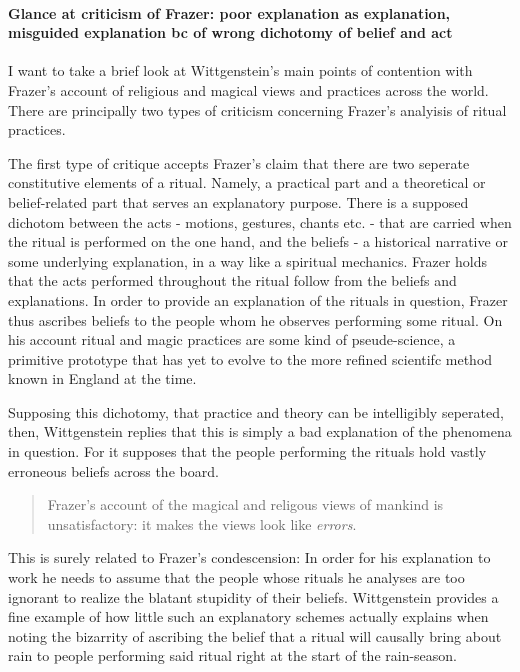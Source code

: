 \documentclass{article}
\begin{document}
 
\paragraph{Glance at criticism of Frazer: poor explanation as explanation, misguided explanation bc of wrong dichotomy of belief and act}
I want to take a brief look at Wittgenstein's main points of contention with Frazer's account of religious and magical views and practices across the world. There are principally two types of criticism concerning Frazer's analyisis of ritual practices. 

The first type of critique accepts Frazer's claim that there are two seperate constitutive elements of a ritual. Namely, a practical part and a theoretical or belief-related part that serves an explanatory purpose. There is a supposed dichotom between the acts - motions, gestures, chants etc. - that are carried when the ritual is performed on the one hand, and the beliefs - a historical narrative or some underlying explanation, in a way like a spiritual mechanics. Frazer holds that the acts performed throughout the ritual follow from the beliefs and explanations. In order to provide an explanation of the rituals in question, Frazer thus ascribes beliefs to the people whom he observes performing some ritual. On his account ritual and magic practices are some kind of pseude-science, a primitive prototype that has yet to evolve to the more refined scientifc method known in England at the time. 

Supposing this dichotomy, that practice and theory can be intelligibly seperated, then, Wittgenstein replies that this is simply a bad explanation of the phenomena in question. For it supposes that the people performing the rituals hold vastly erroneous beliefs across the board.
\begin{quote}
Frazer's account of the magical and religous views of mankind is unsatisfactory: it makes the views look like \textit{errors}.
\end{quote} 
This is surely related to Frazer's condescension: In order for his explanation to work he needs to assume that the people whose rituals he analyses are too ignorant to realize the blatant stupidity of their beliefs. Wittgenstein provides a fine example of how little such an explanatory schemes actually explains when noting the bizarrity of ascribing the belief that a ritual will causally bring about rain to people performing said ritual right at the start of the rain-season.
\end{document}
